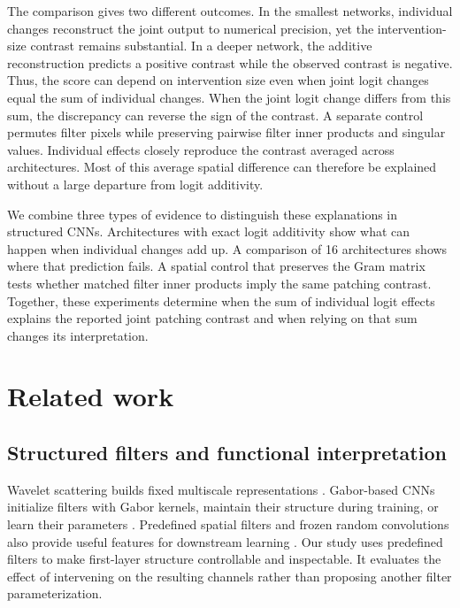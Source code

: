 \documentclass[pdflatex,sn-basic]{sn-jnl}
\begin{document}
The comparison gives two different outcomes. In the smallest networks, individual changes reconstruct the joint output to numerical precision, yet the intervention-size contrast remains substantial. In a deeper network, the additive reconstruction predicts a positive contrast while the observed contrast is negative. Thus, the score can depend on intervention size even when joint logit changes equal the sum of individual changes. When the joint logit change differs from this sum, the discrepancy can reverse the sign of the contrast. A separate control permutes filter pixels while preserving pairwise filter inner products and singular values. Individual effects closely reproduce the contrast averaged across architectures. Most of this average spatial difference can therefore be explained without a large departure from logit additivity.

We combine three types of evidence to distinguish these explanations in structured CNNs. Architectures with exact logit additivity show what can happen when individual changes add up. A comparison of 16 architectures shows where that prediction fails. A spatial control that preserves the Gram matrix tests whether matched filter inner products imply the same patching contrast. Together, these experiments determine when the sum of individual logit effects explains the reported joint patching contrast and when relying on that sum changes its interpretation.

\section{Related work}\label{sec:related}

\subsection{Structured filters and functional interpretation}

Wavelet scattering builds fixed multiscale representations \citep{bruna_2013_scattering-networks}. Gabor-based CNNs initialize filters with Gabor kernels, maintain their structure during training, or learn their parameters \citep{ozbulak_2018_gabor-initialization,molaei_2020_gabor-filter-structure,wang_2024_learnable-gabor,orozco-solis_2024_learnable-gabor-filters}. Predefined spatial filters and frozen random convolutions also provide useful features for downstream learning \citep{linse_2024_predefined-filters,gaudio_2023_fixed-filters,gavrikov_2023_random-convolutions}. Our study uses predefined filters to make first-layer structure controllable and inspectable. It evaluates the effect of intervening on the resulting channels rather than proposing another filter parameterization.
\end{document}
